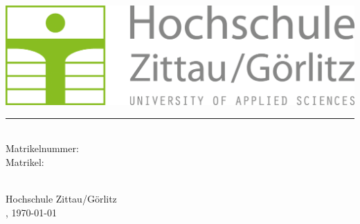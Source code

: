 \begin{titlepage}
    \begin{center}

        \vspace*{1cm}
        \includegraphics{images/hszg_logo.png}
        \vspace*{0.5cm}
        \hrule
        \vspace*{1cm}
        
        \Huge
        \textbf{\thesisTitle}
        
        \vspace{0.5cm}
        \LARGE
        \thesisType

        \vspace{2cm}
        
        \textbf{\authorName}\\
        Matrikelnummer: \authorMatrikeln\\
        Matrikel: \authorMatrikel\\

        \vfill
        
        \vspace{1cm}
        \Large
        \faculty\\
        Hochschule Zittau/Görlitz\\
        \place, \today\\
        
    \end{center}
\end{titlepage}